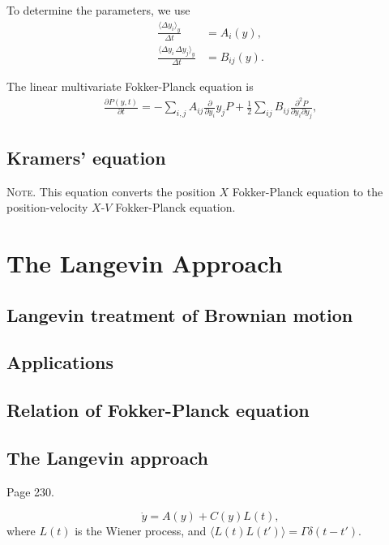 \documentclass{book}
\numberwithin{equation}{section}
\theoremstyle{plain}
\theoremstyle{definition}
\theoremstyle{remark}
\theoremstyle{BoldStyle}
\numberwithin{exercise}{section}
\newcommand{\note}[1]{{\color{DarkGreen}\footnotesize \textsc{Note.} #1}}
\begin{document}
To determine the parameters, we use
\begin{equation}
\begin{aligned}
\frac{ \langle \Delta y_i \rangle_y } { \Delta t }
&=
A_i(y), \\
\frac{ \langle \Delta y_i \, \Delta y_j \rangle_y } { \Delta t }
&=
B_{ij}(y).
\end{aligned}
\tag{6.3}
\end{equation}

The linear multivariate Fokker-Planck equation is
\begin{align}
\frac{  \partial P(y, t) } { \partial t }
=
-\sum_{i,j} A_{ij} \frac{ \partial } { \partial y_i } y_j P
+ \frac 1 2 \sum_{ij} B_{ij} \frac{ \partial^2 P } { \partial y_i \partial y_j },
\tag{6.4}
\end{align}

\section{Kramers' equation}

\note{This equation converts the position $X$ Fokker-Planck equation
  to the position-velocity $X$-$V$ Fokker-Planck equation.
}

\chapter{The Langevin Approach}

\section{Langevin treatment of Brownian motion}

\section{Applications}

\section{Relation of Fokker-Planck equation}

\section{The Langevin approach}

Page 230.

$$
\dot y = A(y) + C(y) L(t),
$$
where $L(t)$ is the Wiener process,
and $\langle L(t) L(t') \rangle = \Gamma \delta(t - t')$.
\end{document}
